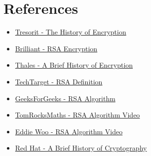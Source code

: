 \documentclass[11pt]{article}
\begin{document}
\section{References}
\begin{itemize}
    \item \href{https://tresorit.com/blog/the-history-of-encryption-the-roots-of-modern-day-cyber-security/#:~:text=The%20earliest%20written%20evidence%20of,original%20meaning%20of%20the%20text}{Tresorit - The History of Encryption}
    
    \item \href{https://brilliant.org/wiki/rsa-encryption/}{Brilliant - RSA Encryption}
    
    \item \href{https://www.thalesgroup.com/en/markets/digital-identity-and-security/magazine/brief-history-encryption}{Thales - A Brief History of Encryption}
    
    \item \href{https://www.techtarget.com/searchsecurity/definition/RSA#:~:text=RSA%20is%20a%20type%20of,is%20used%20to%20decrypt%20it}{TechTarget - RSA Definition}
    
    \item \href{https://www.geeksforgeeks.org/rsa-algorithm-cryptography/}{GeeksForGeeks - RSA Algorithm}
    
    \item \href{https://youtu.be/qph77bTKJTM?feature=shared}{TomRocksMaths - RSA Algorithm Video}
    
    \item \href{https://youtu.be/4zahvcJ9glg?feature=shared}{Eddie Woo - RSA Algorithm Video}
    
    \item \href{https://www.redhat.com/en/blog/brief-history-cryptography}{Red Hat - A Brief History of Cryptography}
\end{itemize}
\newpage
\end{document}
